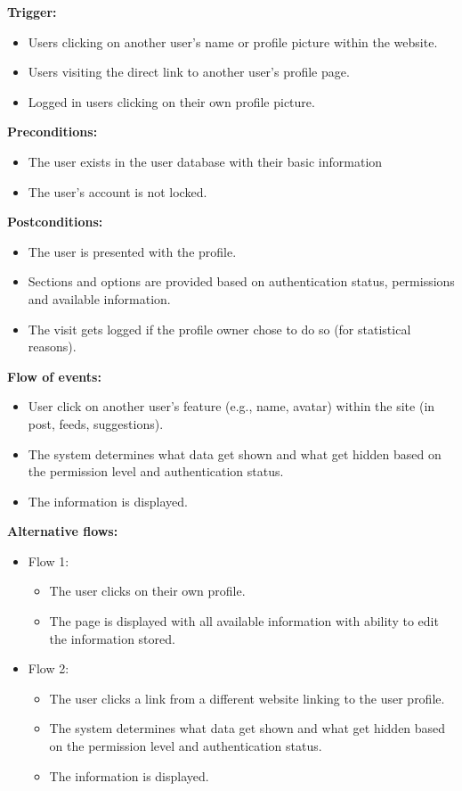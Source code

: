 \documentclass[a4paper]{article}
\begin{document}
\textbf{Trigger:}
\begin{itemize}
  \item Users clicking on another user's name or profile picture within the website.
  \item Users visiting the direct link to another user's profile page.
  \item Logged in users clicking on their own profile picture.
\end{itemize}

\textbf{Preconditions:}
\begin{itemize}
  \item The user exists in the user database with their basic information
  \item The user's account is not locked.
\end{itemize}

\textbf{Postconditions:}
\begin{itemize}
  \item The user is presented with the profile.
  \item Sections and options are provided based on authentication status, permissions and available information.
  \item The visit gets logged if the profile owner chose to do so (for statistical reasons).
\end{itemize}

\textbf{Flow of events:}
\begin{itemize}
  \item User click on another user's feature (e.g., name, avatar) within the site (in post, feeds, suggestions).
  \item The system determines what data get shown and what get hidden based on the permission level and authentication status.
  \item The information is displayed.
\end{itemize}

\textbf{Alternative flows:}
\begin{itemize}
  \item Flow 1:
    \begin{itemize}
      \item The user clicks on their own profile.
      \item The page is displayed with all available information with ability to edit the information stored.
    \end{itemize}
  \item Flow 2:
    \begin{itemize}
      \item The user clicks a link from a different website linking to the user profile.
      \item The system determines what data get shown and what get hidden based on the permission level and authentication status.
      \item The information is displayed.
    \end{itemize}
\end{itemize}
\end{document}
